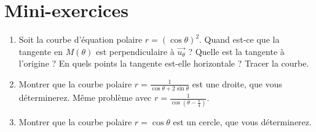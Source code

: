 \section{Mini-exercices}

\begin{frame}
\begin{miniexercice}
\begin{enumerate}
  \item Soit la courbe d'équation polaire $r = (\cos \theta)^2$. 
  Quand est-ce que la tangente en $M(\theta)$ est perpendiculaire à $\overrightarrow{u_\theta}$ ?
  Quelle est la tangente à l'origine ? En quels points la tangente est-elle
  horizontale ? Tracer la courbe.
  
  \item Montrer que la courbe polaire $r=\frac{1}{\cos \theta+2\sin\theta}$
  est une droite, que vous déterminerez. Même problème avec
  $r = \frac{1}{\cos \left( \theta-\frac\pi4 \right)}$.
  
  \item Montrer que la courbe polaire $r = \cos \theta$
  est un cercle, que vous déterminerez.
\end{enumerate}
\end{miniexercice}
\end{frame}



